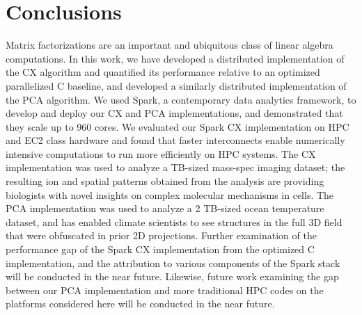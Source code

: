 \section{Conclusions}
\label{sec:conclusion}

Matrix factorizations are an important and ubiquitous class of linear algebra
computations. In this work, we have developed a distributed
implementation of the CX algorithm and quantified its performance relative to
an optimized parallelized C baseline, and developed a similarly distributed
implementation of the PCA algorithm. We used Spark, a contemporary data
analytics framework, to develop and deploy our CX and PCA implementations, and
demonstrated that they scale up to 960 cores. We evaluated our Spark CX
implementation on HPC and EC2 class hardware and found that faster
interconnects enable numerically intensive computations to run more efficiently
on HPC systems. The CX implementation was used to analyze a TB-sized mass-spec
imaging dataset; the resulting ion and spatial patterns obtained from the
analysis are providing biologists with novel insights on complex molecular
mechanisms in cells. The PCA implementation was used to analyze a 2 TB-sized
ocean temperature dataset, and has enabled climate scientists to see structures
in the full 3D field that were obfuscated in prior 2D projections. Further
examination of the performance gap of the Spark CX implementation from the
optimized C implementation, and the attribution to various components of the
Spark stack will be conducted in the near future. Likewise, future work
examining the gap between our PCA implementation and more traditional HPC codes
on the platforms considered here will be conducted in the near future.


